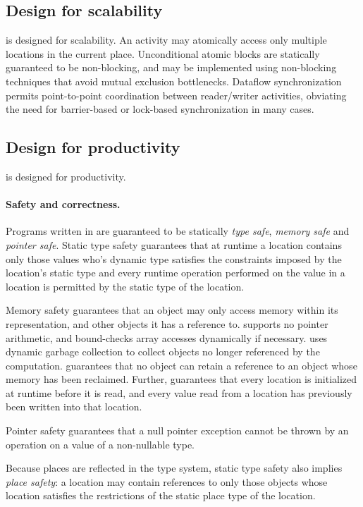 \subsection{Design for scalability}
\Xten{} is designed for scalability. An activity may atomically
access only multiple locations in the current place. Unconditional
atomic blocks are statically guaranteed to be non-blocking, and may
be implemented using non-blocking techniques that avoid mutual
exclusion bottlenecks. Dataflow synchronization permits point-to-point
coordination between reader/writer activities, obviating the need for
barrier-based or lock-based synchronization in many cases.

\subsection{Design for productivity}
\Xten{} is designed for productivity. 

\paragraph{Safety and correctness.} 
Programs written in \Xten{} are guaranteed to be statically
\emph{type
safe}, \emph{memory safe} and \emph{pointer safe}. Static type safety
guarantees that at runtime a location contains only those values who's
dynamic type satisfies the constraints imposed by the location's
static type and every runtime operation performed on the value in a
location is permitted by the static type of the location.

Memory safety guarantees that an object may only access memory within
its representation, and other objects it has a reference to. \Xten{}
supports no pointer arithmetic, and bound-checks array accesses
dynamically if necessary. \Xten{} uses dynamic garbage collection to
collect objects no longer referenced by the computation. \Xten{}
guarantees that no object can retain a reference to an object
whose memory has been reclaimed.  Further, \Xten{} guarantees that
every location is initialized at runtime before it is read, 
and every value read from a location has previously been written into
that location. 

Pointer safety guarantees that a null pointer exception cannot be
thrown by an operation on a value of a non-nullable type.

Because places are reflected in the type system, static type safety
also implies \emph{place safety}: a location may contain references to only
those objects whose location satisfies the restrictions of the static
place type of the location.

